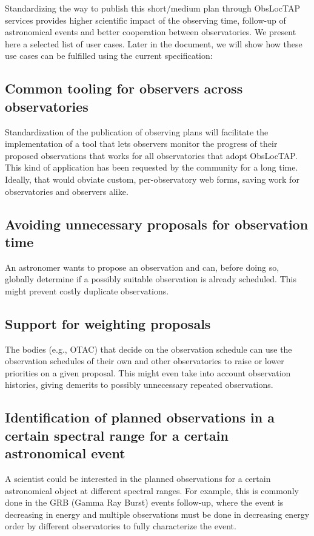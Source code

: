 \documentclass[11pt,a4paper]{ivoa}
\begin{document}
Standardizing the way to publish this short/medium plan through ObsLocTAP services provides 
higher scientific impact of the observing time, follow-up of astronomical events and 
better cooperation between observatories. We present here a selected list of user cases. 
Later in the document, we will show how these use cases can be fulfilled using the current specification:

\subsection{Common tooling for observers across observatories}
Standardization of the publication of observing plans will facilitate the implementation 
of a tool that lets observers monitor the progress of their proposed observations that 
works for all observatories that adopt ObsLocTAP. This kind of application has been 
requested by the community for a long time. Ideally, that would obviate custom, 
per-observatory web forms, saving work for observatories and observers alike. 

\subsection{Avoiding unnecessary proposals for observation time}
An astronomer wants to propose an observation and can, before doing so, globally 
determine if a possibly suitable observation is already scheduled.  This might prevent 
costly duplicate observations. 

\subsection{Support for weighting proposals}
The bodies (e.g., OTAC) that decide on the observation schedule can use the observation 
schedules of their own and other observatories to raise or lower priorities on a given 
proposal. This might even take into   account observation histories, giving demerits to 
possibly unnecessary   repeated observations.

\subsection{Identification of planned observations in a certain spectral range for a certain astronomical event}
A scientist could be interested in the planned observations for a certain astronomical 
object at different spectral ranges. For example, this is commonly done in the GRB 
(Gamma Ray Burst) events follow-up, where the event is decreasing in energy and multiple 
observations must be done in decreasing energy order by different observatories to fully 
characterize the event.
\end{document}
